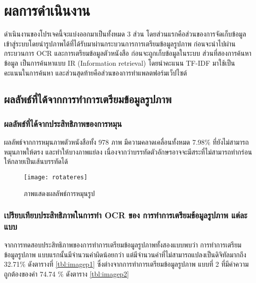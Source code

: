 \chapter{ผลการดำเนินงาน}

ดำเนินงานของโปรเจคนี้จะแบ่งออกมาเป็นทั้งหมด 3 ส่วน โดยส่วนแรกคือส่วนของการจัดเก็บข้อมูลเข้าสู่ระบบโดยนำรูปภาพได้ที่ได้รับมาผ่านกระบวนการการเตรียมข้อมูลรูปภาพ ก่อนจะนำไปผ่านกระบวนการ OCR และการเตรียมข้อมูลตัวหนังสือ ก่อนจะถูกเก็บข้อมูลในระบบ ส่วนที่สองการค้นหาข้อมูล เป็นการค้นหาแบบ IR (Information retrieval) โดยนำคะแนน TF-IDF มาใช้เป็นคะแนนในการค้นหา และส่วนสุดท้ายคือส่วนของการทำแพลตฟอร์มเว็ปไซต์

\section{ผลลัพธ์ที่ได้จากการทำการเตรียมข้อมูลรูปภาพ}

\subsection{ผลลัพธ์ที่ได้จากประสิทธิภาพของการหมุน}
ผลลัพธ์จากการหมุนภาพตัวหนังสือทั้ง 978 ภาพ มีความคลาดเคลื่อนทั้งหมด 7.98\% ที่ยังไม่สามารถหมุนภาพให้ตรง และทำให้บางภาพแย่ลง เนื่องจากว่าบรรทัดตัวอักษรอาจจะมีสระที่ไม่สามารถทำกร่อนให้กลายเป็นเส้นบรรทัดได้

\begin{figure}[H]
    \centering
    \texttt{[image: rotateres]}
    \caption{ภาพแสดงผลลัพธ์การหมุนรูป}\label{fig:rotateres}
\end{figure}

\subsection{เปรียบเทียบประสิทธิภาพในการทำ OCR ของ การทำการเตรียมข้อมูลรูปภาพ แต่ละแบบ}

จากการทดสอบประสิทธิภาพของการทำการเตรียมข้อมูลรูปภาพทั้งสองแบบพบว่า การทำการเตรียมข้อมูลรูปภาพ แบบแรกนั้นมีจำนวนคำผิดน้อยกว่า แต่มีจำนวนคำที่ไม่สามารถแปลงเป็นดิจิทัลมากถึง 32.71\% ดังตารางที่ \ref{tbl:imagep1} ซึ่งต่างจากการทำการเตรียมข้อมูลรูปภาพ แบบที่ 2 ที่มีค่าความถูกต้องของคำ 74.74 \% ดังตาราง \ref{tbl:imagep2}

